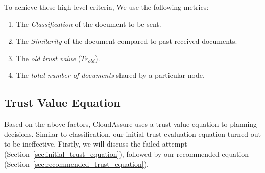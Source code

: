 To achieve these high-level criteria, We use the following metrics:
\begin{enumerate}
    \item The \emph{Classification} of the document to be sent.
    \item The \emph{Similarity} of the document compared to past received
        documents.
    \item The \emph{old trust value} (\(Tr_{old}\)).
    \item The \emph{total number of documents} shared by a particular node.
\end{enumerate}

\subsection{Trust Value Equation}
Based on the above factors, CloudAssure uses a trust value equation to planning 
decisions. Similar to classification, our initial trust evaluation equation
turned out to be ineffective. Firstly, we will discuss the failed attempt
(Section~\ref{sec:initial_trust_equation}), followed by our recommended equation
(Section~\ref{sec:recommended_trust_equation}). 

